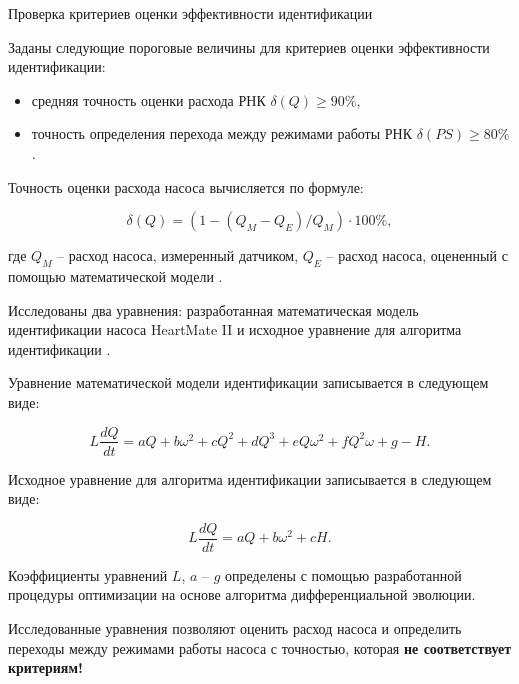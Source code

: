 \documentclass[a4paper, 9pt]{beamer}
\begin{document}
\begin{frame}{Проверка критериев оценки эффективности идентификации}

\scriptsize
Заданы следующие пороговые величины для критериев оценки эффективности идентификации:

\begin{itemize}
 \item \vskip-4pt средняя точность оценки расхода РНК $\delta(Q) \geq 90 \%$,
 \item \vskip1pt точность определения перехода между режимами работы РНК $\delta(PS) \geq 80 \%$.
\end{itemize} \small

\begin{minipage}[ht]{0.48\textwidth}
\vskip-14pt
\tiny Точность оценки расхода насоса вычисляется по формуле:

\vskip-3pt
\begin{equation}
	\delta(Q) = \left( 1 - (Q_M - Q_E)/Q_M \right) \cdot 100 \%,
\end{equation}

где $Q_M$ -- расход насоса, измеренный датчиком, $Q_E$ -- расход насоса, оцененный с помощью математической модели \footnotemark[1]. 

Исследованы два уравнения: разработанная математическая модель идентификации насоса HeartMate II и исходное уравнение для алгоритма идентификации \footnotemark[2].

Уравнение математической модели идентификации записывается в следующем виде:

\vskip-9pt
\begin{equation} \tag{3}
	L\frac{dQ}{dt} = aQ + b\omega^2 + cQ^2 + dQ^3 + eQ\omega^2 + fQ^2\omega + g - H.
\end{equation}
\vskip-2pt

Исходное уравнение для алгоритма идентификации записывается в следующем виде:

\vskip-4pt
\begin{equation} \tag{4}
	L\frac{dQ}{dt} = aQ + b\omega^2 + cH. %
\end{equation}

\vskip0pt
Коэффициенты уравнений $L$, $a$ -- $g$ определены с помощью разработанной процедуры оптимизации на основе алгоритма дифференциальной эволюции. 

Исследованные уравнения позволяют оценить расход насоса и определить переходы между режимами работы насоса с точностью, которая 
\vskip-3pt
\large \bf \textcolor{red!70}{не соответствует критериям!}
\vskip-9pt
\end{minipage}
\hfill
\begin{minipage}[ht]{0.48\textwidth}


\end{minipage}
\end{frame}
\end{document}
